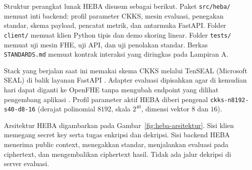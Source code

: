 \documentclass[12pt,a4paper,oneside]{report}
\begin{document}
Struktur perangkat lunak HEBA disusun sebagai berikut. Paket \texttt{src/heba/} memuat inti backend: profil parameter CKKS, mesin evaluasi, penegakan standar, skema payload, pencatat metrik, dan antarmuka FastAPI. Folder \texttt{client/} memuat klien Python tipis dan demo skoring linear. Folder \texttt{tests/} memuat uji mesin FHE, uji API, dan uji penolakan standar. Berkas \texttt{STANDARDS.md} memuat kontrak interaksi yang diringkas pada Lampiran A.

Stack yang berjalan saat ini memakai skema CKKS melalui TenSEAL (Microsoft SEAL) di balik layanan FastAPI \cite{benaissa2021tenseal,vinko2026secureByDesign}. Adapter evaluasi dipisahkan agar di kemudian hari dapat diganti ke OpenFHE tanpa mengubah endpoint yang dilihat pengembang aplikasi \cite{badawi2022openfhe,brynds2025cryptoracle}. Profil parameter aktif HEBA diberi pengenal \texttt{ckks-n8192-s40-d8-16} (derajat polinomial $8192$, skala $2^{40}$, dimensi vektor $8$ dan $16$).

Arsitektur HEBA digambarkan pada Gambar~\ref{fig:heba-arsitektur}. Sisi klien memegang secret key serta tugas enkripsi dan dekripsi. Sisi backend HEBA menerima public context, menegakkan standar, menjalankan evaluasi pada ciphertext, dan mengembalikan ciphertext hasil. Tidak ada jalur dekripsi di server evaluasi.
\end{document}
